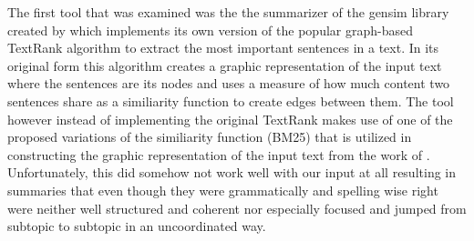 The first tool that was examined was the the summarizer of the gensim library created by \citet{rehurek_lrec} which implements its own version of the popular graph-based TextRank algorithm to extract the most important sentences in a text. In its original form this algorithm creates a graphic representation of the input text where the sentences are its nodes and uses a measure of how much content two sentences share as a similiarity function to create edges between them. The tool however instead of implementing the original TextRank makes use of one of the proposed variations of the similiarity function (BM25) that is utilized in constructing the graphic representation of the input text from the work of \citet{DBLP:journals/corr/BarriosLAW16}. Unfortunately, this did somehow not work well with our input at all resulting in summaries that even though they were grammatically and spelling wise right were neither well structured and coherent nor especially focused and jumped from subtopic to subtopic in an uncoordinated way.  

